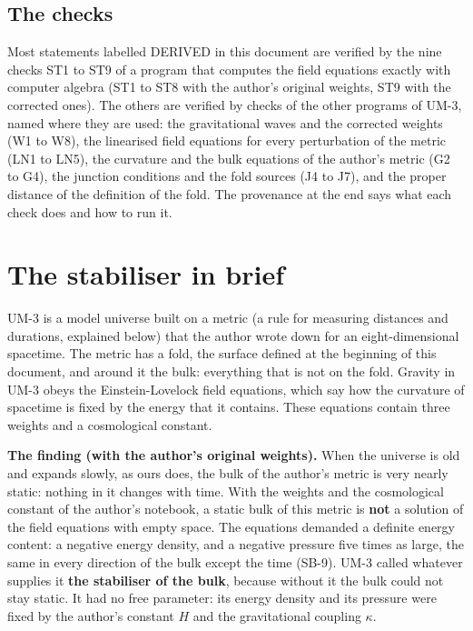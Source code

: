 \documentclass[
  10pt,
]{article}
\begin{document}
\hypertarget{the-checks}{%
\subsection{The checks}\label{the-checks}}

Most statements labelled DERIVED in this document are verified by the
nine checks ST1 to ST9 of a program that computes the field equations
exactly with computer algebra (ST1 to ST8 with the author's original
weights, ST9 with the corrected ones). The others are verified by checks
of the other programs of UM-3, named where they are used: the
gravitational waves and the corrected weights (W1 to W8), the linearised
field equations for every perturbation of the metric (LN1 to LN5), the
curvature and the bulk equations of the author's metric (G2 to G4), the
junction conditions and the fold sources (J4 to J7), and the proper
distance of the definition of the fold. The provenance at the end says
what each check does and how to run it.

\hypertarget{the-stabiliser-in-brief}{%
\section{The stabiliser in brief}\label{the-stabiliser-in-brief}}

UM-3 is a model universe built on a metric (a rule for measuring
distances and durations, explained below) that the author wrote down for
an eight-dimensional spacetime. The metric has a fold, the surface
defined at the beginning of this document, and around it the bulk:
everything that is not on the fold. Gravity in UM-3 obeys the
Einstein-Lovelock field equations, which say how the curvature of
spacetime is fixed by the energy that it contains. These equations
contain three weights and a cosmological constant.

\textbf{The finding (with the author's original weights).} When the
universe is old and expands slowly, as ours does, the bulk of the
author's metric is very nearly static: nothing in it changes with time.
With the weights and the cosmological constant of the author's notebook,
a static bulk of this metric is \textbf{not} a solution of the field
equations with empty space. The equations demanded a definite energy
content: a negative energy density, and a negative pressure five times
as large, the same in every direction of the bulk except the time
(SB-9). UM-3 called whatever supplies it \textbf{the stabiliser of the
bulk}, because without it the bulk could not stay static. It had no free
parameter: its energy density and its pressure were fixed by the
author's constant \(H\) and the gravitational coupling \(\kappa\).
\end{document}
